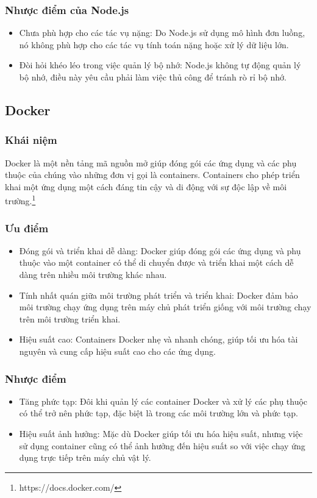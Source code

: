 \subsubsection{Nhược điểm của Node.js}
\begin{itemize}
    \item Chưa phù hợp cho các tác vụ nặng: Do Node.js sử dụng mô hình đơn luồng, nó không phù hợp cho các tác vụ tính toán nặng hoặc xử lý dữ liệu lớn.
    \item Đòi hỏi khéo léo trong việc quản lý bộ nhớ: Node.js không tự động quản lý bộ nhớ, điều này yêu cầu phải làm việc thủ công để tránh rò rỉ bộ nhớ.
\end{itemize}
\subsection{Docker}
\subsubsection{Khái niệm}
\indent Docker là một nền tảng mã nguồn mở giúp đóng gói các ứng dụng và các phụ thuộc của chúng vào những đơn vị gọi là containers. Containers cho phép triển khai một ứng dụng một cách đáng tin cậy và di động với sự độc lập về môi trường.\footnote{https://docs.docker.com/}
\subsubsection{Ưu điểm}
\begin{itemize}
    \item Đóng gói và triển khai dễ dàng: Docker giúp đóng gói các ứng dụng và phụ thuộc vào một container có thể di chuyển được và triển khai một cách dễ dàng trên nhiều môi trường khác nhau.
    \item Tính nhất quán giữa môi trường phát triển và triển khai: Docker đảm bảo môi trường chạy ứng dụng trên máy chủ phát triển giống với môi trường chạy trên môi trường triển khai.
    \item Hiệu suất cao: Containers Docker nhẹ và nhanh chóng, giúp tối ưu hóa tài nguyên và cung cấp hiệu suất cao cho các ứng dụng.
\end{itemize}
\subsubsection{Nhược điểm}
\begin{itemize}
    \item Tăng phức tạp: Đôi khi quản lý các container Docker và xử lý các phụ thuộc có thể trở nên phức tạp, đặc biệt là trong các môi trường lớn và phức tạp.
    \item Hiệu suất ảnh hưởng: Mặc dù Docker giúp tối ưu hóa hiệu suất, nhưng việc sử dụng container cũng có thể ảnh hưởng đến hiệu suất so với việc chạy ứng dụng trực tiếp trên máy chủ vật lý.
\end{itemize}

